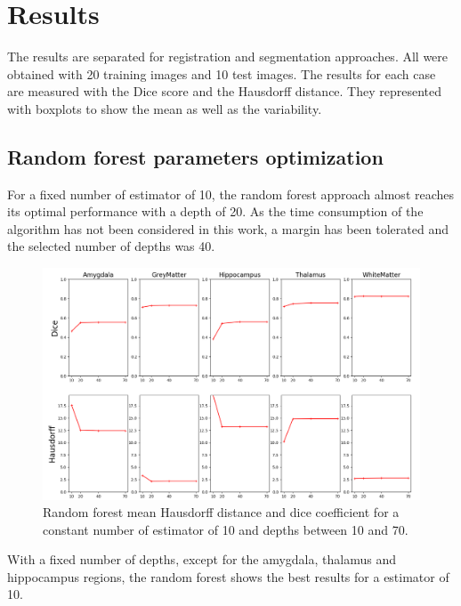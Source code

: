 \section*{Results}
The results are separated for registration and segmentation approaches. All were obtained with 20 training images and 10 test images. The results for each case are measured with the Dice score and the Hausdorff distance. They represented with boxplots to show the mean as well as the variability.

\subsection*{Random forest parameters optimization}
For a fixed number of estimator of 10, the random forest approach almost reaches its optimal performance with a depth of 20. As the time consumption of the algorithm has not been considered in this work, a margin has been tolerated and the selected number of depths was 40. 

\begin{figure}[h!]
	\centering
	\includegraphics[width=\linewidth]{img/plotMLOptDepth2}
	\caption{Random forest mean Hausdorff distance and dice coefficient for a constant number of estimator of 10 and depths between 10 and 70.}
	\label{fig:MLOptDepth}
\end{figure}

With a fixed number of depths, except for the amygdala, thalamus and hippocampus regions, the random forest shows the best results for a estimator of 10.

